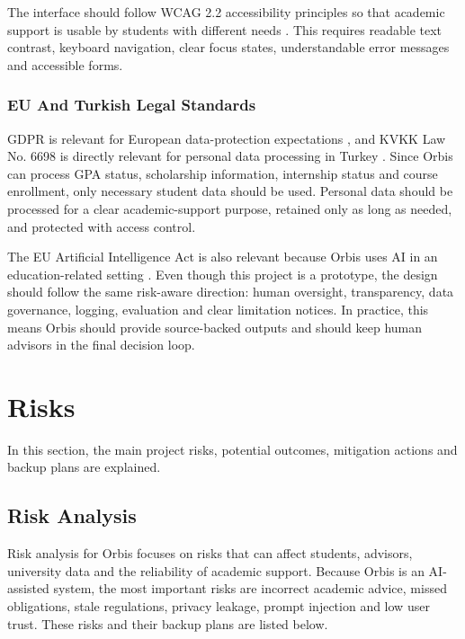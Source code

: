 \documentclass[a4paper,12pt]{article}
\begin{document}
The interface should follow WCAG 2.2 accessibility principles so that academic support is usable by students with different needs \cite{wcag22}. This requires readable text contrast, keyboard navigation, clear focus states, understandable error messages and accessible forms.

\subsubsection{EU And Turkish Legal Standards}
GDPR is relevant for European data-protection expectations \cite{gdpr2016}, and KVKK Law No. 6698 is directly relevant for personal data processing in Turkey \cite{kvkk6698}. Since Orbis can process GPA status, scholarship information, internship status and course enrollment, only necessary student data should be used. Personal data should be processed for a clear academic-support purpose, retained only as long as needed, and protected with access control.

The EU Artificial Intelligence Act is also relevant because Orbis uses AI in an education-related setting \cite{euAiAct2024}. Even though this project is a prototype, the design should follow the same risk-aware direction: human oversight, transparency, data governance, logging, evaluation and clear limitation notices. In practice, this means Orbis should provide source-backed outputs and should keep human advisors in the final decision loop.

\section{Risks}
In this section, the main project risks, potential outcomes, mitigation actions and backup plans are explained.

\subsection{Risk Analysis}
Risk analysis for Orbis focuses on risks that can affect students, advisors, university data and the reliability of academic support. Because Orbis is an AI-assisted system, the most important risks are incorrect academic advice, missed obligations, stale regulations, privacy leakage, prompt injection and low user trust. These risks and their backup plans are listed below.
\end{document}
